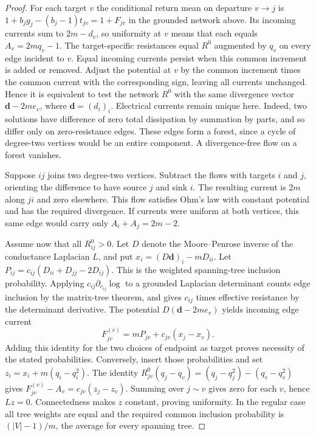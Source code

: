 \documentclass[11pt]{article}
\begin{document}
\begin{proof}
For each target $v$ the conditional return mean on departure $v\to j$
is $1+b_jg_j-(b_j-1)t_{jv}=1+F_{jv}$ in the grounded network above.
Its incoming currents sum to $2m-d_v$, so uniformity at $v$ means
that each equals $A_v=2m q_v-1$.
The target-specific resistances equal $R^0$ augmented by $q_v$ on
every edge incident to $v$. Equal incoming currents persist when this
common increment is added or removed. Adjust the potential at $v$ by
the common increment times the common current with the corresponding
sign, leaving all currents unchanged. Hence it is equivalent to test
the network $R^0$ with the same divergence vector
$\mathbf d-2m e_v$, where $\mathbf d=(d_i)_i$.
Electrical currents remain unique here. Indeed, two solutions have
difference of zero total dissipation by summation by parts, and so
differ only on zero-resistance edges. These edges form a forest,
since a cycle of degree-two vertices would be an entire component.
A divergence-free flow on a forest vanishes.

Suppose $ij$ joins two degree-two vertices. Subtract the flows with
targets $i$ and $j$, orienting the difference to have source $j$ and
sink $i$. The resulting current is $2m$ along $ji$ and zero elsewhere. This flow satisfies Ohm's law with constant potential and has the
required divergence. If currents were uniform at both vertices, this
same edge would carry only $A_i+A_j=2m-2$.

Assume now that all $R^0_{ij}>0$. Let $D$ denote the Moore--Penrose
inverse of the conductance Laplacian $L$, and put
$x_i=(D\mathbf d)_i-mD_{ii}$. Let
$P_{ij}=c_{ij}(D_{ii}+D_{jj}-2D_{ij})$. This is the weighted
spanning-tree inclusion probability. Applying
$c_{ij}\partial_{c_{ij}}\log$ to a grounded Laplacian determinant
counts edge inclusion by the matrix-tree theorem, and gives
$c_{ij}$ times effective resistance by the determinant derivative.
The potential $D(\mathbf d-2me_v)$ yields incoming edge current
\[
 F^{(v)}_{jv}=mP_{jv}+c_{jv}(x_j-x_v).
\]
Adding this identity for the two choices of endpoint as target proves
necessity of the stated probabilities. Conversely, insert those
probabilities and set $z_i=x_i+m(q_i-q_i^2)$. The identity
$R^0_{jv}(q_j-q_v)=(q_j-q_j^2)-(q_v-q_v^2)$ gives
$F^{(v)}_{jv}-A_v=c_{jv}(z_j-z_v)$.
Summing over $j\sim v$ gives zero for each $v$, hence $Lz=0$.
Connectedness makes $z$ constant, proving uniformity.
In the regular case all tree weights are equal and the required common
inclusion probability is $(|V|-1)/m$, the average for every spanning
tree.
\end{proof}
\end{document}
